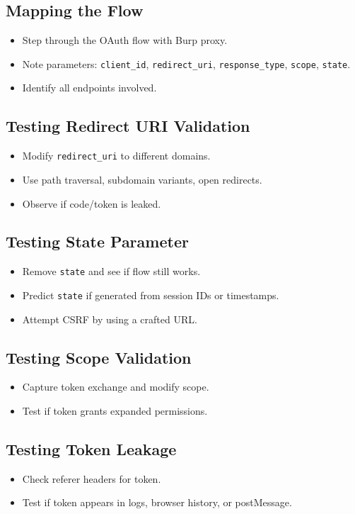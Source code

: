 \documentclass[12pt,a4paper]{article}
\begin{document}
\subsection{Mapping the Flow}
\begin{itemize}
    \item Step through the OAuth flow with Burp proxy.
    \item Note parameters: \texttt{client\_id}, \texttt{redirect\_uri}, \texttt{response\_type}, \texttt{scope}, \texttt{state}.
    \item Identify all endpoints involved.
\end{itemize}

\subsection{Testing Redirect URI Validation}
\begin{itemize}
    \item Modify \texttt{redirect\_uri} to different domains.
    \item Use path traversal, subdomain variants, open redirects.
    \item Observe if code/token is leaked.
\end{itemize}

\subsection{Testing State Parameter}
\begin{itemize}
    \item Remove \texttt{state} and see if flow still works.
    \item Predict \texttt{state} if generated from session IDs or timestamps.
    \item Attempt CSRF by using a crafted URL.
\end{itemize}

\subsection{Testing Scope Validation}
\begin{itemize}
    \item Capture token exchange and modify scope.
    \item Test if token grants expanded permissions.
\end{itemize}

\subsection{Testing Token Leakage}
\begin{itemize}
    \item Check referer headers for token.
    \item Test if token appears in logs, browser history, or postMessage.
\end{itemize}
\end{document}
